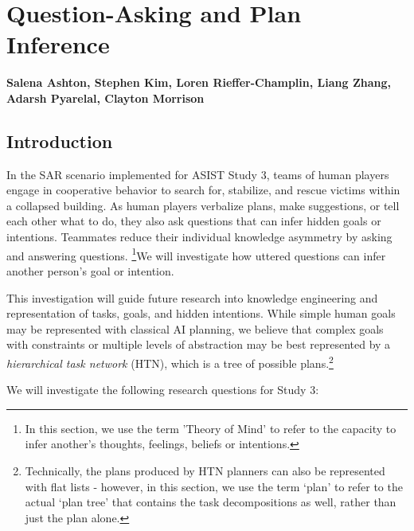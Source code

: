 \chapter{Question-Asking and Plan Inference}
\label{ch:question_plan}
\textbf{Salena Ashton, Stephen Kim, Loren Rieffer-Champlin, Liang Zhang,
Adarsh Pyarelal, Clayton Morrison}

\section{Introduction}

In the SAR scenario implemented for ASIST Study 3, teams of human
players engage in cooperative behavior to search for, stabilize, and rescue
victims within a collapsed building. As human players verbalize plans, make
suggestions, or tell each other what to do, they also ask questions that can
infer hidden goals or intentions. Teammates reduce their individual knowledge
asymmetry by asking and answering questions. 
\footnote{In this section, we use the term 'Theory of Mind' to refer to the
    capacity to infer another's thoughts, feelings, beliefs or
intentions.}We will investigate how uttered questions can infer another
person's goal or intention. 

This investigation will guide future research into knowledge engineering and
representation of tasks, goals, and hidden intentions. While simple human goals
may be represented with classical AI planning, we believe that complex goals with 
constraints or multiple levels of abstraction may be best represented by a
\emph{hierarchical task network} (HTN), which is a tree of possible
plans.\footnote{Technically, the plans produced by HTN planners can also be
    represented with flat lists - however, in this section, we use the term
`plan' to refer to the actual `plan tree' that contains the task decompositions
as well, rather than just the plan alone.}

We will investigate the following research questions for Study 3:

